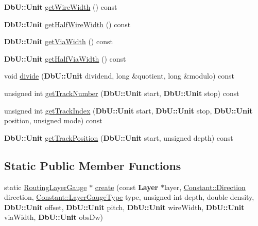 \begin{DoxyCompactItemize}
{\bf Db\-U\-::\-Unit} \hyperlink{classCRL_1_1RoutingLayerGauge_af8d0766b3741ef041bb40805e9ade562}{get\-Wire\-Width} () const 
\item 
{\bf Db\-U\-::\-Unit} \hyperlink{classCRL_1_1RoutingLayerGauge_aca47ad42af7852a7a30d7b470b43f290}{get\-Half\-Wire\-Width} () const 
\item 
{\bf Db\-U\-::\-Unit} \hyperlink{classCRL_1_1RoutingLayerGauge_a5fbf1913fb9198f8a56c969c9fec983f}{get\-Via\-Width} () const 
\item 
{\bf Db\-U\-::\-Unit} \hyperlink{classCRL_1_1RoutingLayerGauge_a74ee6aee07965ed8ef80ccf12f6d4984}{get\-Half\-Via\-Width} () const 
\item 
void \hyperlink{classCRL_1_1RoutingLayerGauge_a2a2231bbb064fe316977291df7ef016c}{divide} ({\bf Db\-U\-::\-Unit} dividend, long \&quotient, long \&modulo) const 
\item 
unsigned int \hyperlink{classCRL_1_1RoutingLayerGauge_ab9a7e3219b19617f91cd89c6e7eeaee2}{get\-Track\-Number} ({\bf Db\-U\-::\-Unit} start, {\bf Db\-U\-::\-Unit} stop) const 
\item 
unsigned int \hyperlink{classCRL_1_1RoutingLayerGauge_a4e51ea096d791f11949d8c732d8372ae}{get\-Track\-Index} ({\bf Db\-U\-::\-Unit} start, {\bf Db\-U\-::\-Unit} stop, {\bf Db\-U\-::\-Unit} position, unsigned mode) const 
\item 
{\bf Db\-U\-::\-Unit} \hyperlink{classCRL_1_1RoutingLayerGauge_a74e70ddcc3f05807c914f5d25a8d2430}{get\-Track\-Position} ({\bf Db\-U\-::\-Unit} start, unsigned depth) const 
\end{DoxyCompactItemize}
\subsection*{Static Public Member Functions}
\begin{DoxyCompactItemize}
\item 
static \hyperlink{classCRL_1_1RoutingLayerGauge}{Routing\-Layer\-Gauge} $\ast$ \hyperlink{classCRL_1_1RoutingLayerGauge_afe17db013bf6a933c2af4e847bfd7918}{create} (const {\bf Layer} $\ast$layer, \hyperlink{namespaceConstant_ac081a99f2b64361919ed5d9f37c0f9af}{Constant\-::\-Direction} direction, \hyperlink{namespaceConstant_ab2e46a17cc373a268c5c24fa0e2067e5}{Constant\-::\-Layer\-Gauge\-Type} type, unsigned int depth, double density, {\bf Db\-U\-::\-Unit} offset, {\bf Db\-U\-::\-Unit} pitch, {\bf Db\-U\-::\-Unit} wire\-Width, {\bf Db\-U\-::\-Unit} via\-Width, {\bf Db\-U\-::\-Unit} obs\-Dw)
\end{DoxyCompactItemize}


